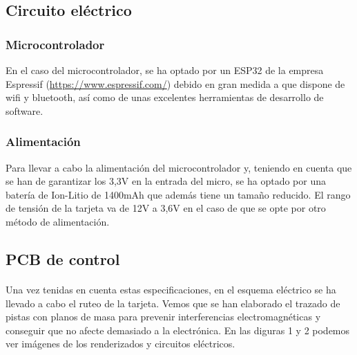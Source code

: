 \documentclass[paper=a4, fontsize=11pt,twoside]{scrartcl}	%
\begin{document}
    \subsection{Circuito eléctrico}
        \subsubsection{Microcontrolador} 
            En el caso del microcontrolador, se ha optado por un ESP32 de la empresa Espressif (\url{https://www.espressif.com/})
            debido en gran medida a que dispone de wifi y bluetooth, así como de unas excelentes herramientas
            de desarrollo de software. 
        \subsubsection{Alimentación} 
            Para llevar a cabo la alimentación del microcontrolador y, teniendo en cuenta que se han de garantizar los 3,3V en la entrada
            del micro, se ha optado por una batería de Ion-Litio de 1400mAh que además tiene un tamaño reducido. El rango de tensión de la
            tarjeta va de 12V a 3,6V en el caso de que se opte por otro método de alimentación.
    \subsection{PCB de control}
        \paragraph{}
        Una vez tenidas en cuenta estas especificaciones, en el esquema eléctrico se ha llevado a cabo el ruteo de la tarjeta.
        Vemos que se han elaborado el trazado de pistas con planos de masa para prevenir interferencias electromagnéticas
        y conseguir que no afecte demasiado a la electrónica. En las diguras 1 y 2 podemos ver imágenes de los renderizados y circuitos 
        eléctricos.
        
\end{document}
